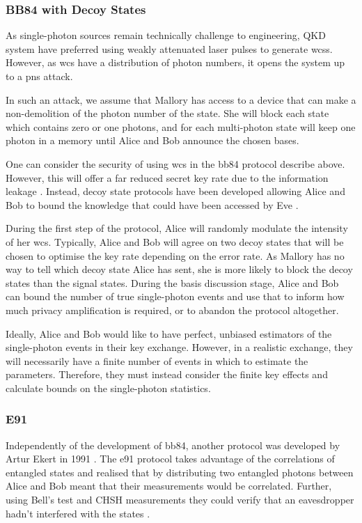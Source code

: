 \subsubsection*{BB84 with Decoy States}

As single-photon sources remain technically challenge to engineering, \ac{QKD} system have preferred using weakly attenuated laser pulses to generate \acp{wcs}. However, as \ac{wcs} have a distribution of photon numbers, it opens the system up to a \ac{pns} attack. 

In such an attack, we assume that Mallory has access to a device that can make a non-demolition of the photon number of the state. She will block each state which contains zero or one photons, and for each multi-photon state will keep one photon in a memory until Alice and Bob announce the chosen bases. 

One can consider the security of using \ac{wcs} in the \ac{bb84} protocol describe above. However, this will offer a far reduced secret key rate due to the information leakage \cite{Norbert2000Security, Brassard2000Limitations}. Instead, decoy state protocols have been developed allowing Alice and Bob to bound the knowledge that could have been accessed by Eve \cite{Lo2005}. 

During the first step of the protocol, Alice will randomly modulate the intensity of her \ac{wcs}. Typically, Alice and Bob will agree on two decoy states that will be chosen to optimise the key rate depending on the error rate. As Mallory has no way to tell which decoy state Alice has sent, she is more likely to block the decoy states than the signal states. During the basis discussion stage, Alice and Bob can bound the number of true single-photon events and use that to inform how much privacy amplification is required, or to abandon the protocol altogether.

Ideally, Alice and Bob would like to have perfect, unbiased estimators of the single-photon events in their key exchange. However, in a realistic exchange, they will necessarily have a finite number of events in which to estimate the parameters. Therefore, they must instead consider the finite key effects and calculate bounds on the single-photon statistics. 

\subsubsection*{E91}

Independently of the development of \ac{bb84}, another protocol was developed by Artur Ekert in 1991 \cite{E91}. The \ac{e91} protocol takes advantage of the correlations of entangled states and realised that by distributing two entangled photons between Alice and Bob meant that their measurements would be correlated. Further, using Bell's test and CHSH measurements they could verify that an eavesdropper hadn't interfered with the states \cite{Bell1964Einstein, CHSH}. 

